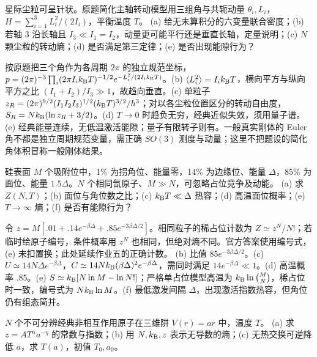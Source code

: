 \begin{exercise}
星际尘粒可呈针状。原题简化主轴转动模型用三组角与共轭动量 $\theta_i,L_i$，$H=\sum_{i=1}^3L_i^2/(2I_i)$，平衡温度 $T$。
(a) 给无未算积分的六变量联合密度；(b) 若轴 3 沿长轴且 $I_3\ll I_1=I_2$，动量更可能平行还是垂直长轴，定量说明；(c) $N$ 颗尘粒的转动熵；(d) 是否满足第三定律；(e) 是否出现能隙行为？
\end{exercise}
\begin{solution}
按原题把三个角作为各周期 $2\pi$ 的独立规范坐标，$p=(2\pi)^{-3}\prod_i(2\pi I_ik_{\mathrm B} T)^{-1/2}e^{-L_i^2/(2I_ik_{\mathrm B} T)}$。(b) $\langle L_i^2\rangle=I_ik_{\mathrm B} T$，横向平方与纵向平方之比 $(I_1+I_2)/I_3\gg1$，故趋向垂直。(c) 单粒子 $z_R=(2\pi)^{9/2}(I_1I_2I_3)^{1/2}(k_{\mathrm B} T)^{3/2}/h^3$；对以各尘粒位置区分的转动自由度，$S_R=Nk_{\mathrm B}(\ln z_R+3/2)$。(d) $T\to0$ 时趋负无穷，经典近似失效，须用量子谱。(e) 经典能量连续，无低温激活能隙；量子有限转子则有。一般真实刚体的 Euler 角不都是独立周期规范变量，需正确 $SO(3)$ 测度与动量；这里不把题设的简化角体积冒称一般刚体结果。
\end{solution}
\begin{exercise}
硅表面 $M$ 个吸附位中，1\% 为拐角位、能量零，14\% 为边缘位、能量 $\Delta$，85\% 为面位、能量 $1.5\Delta$。$N$ 个相同氙原子、$M\gg N$，可忽略占位竞争及动能。
(a) 求 $Z(N,T)$；(b) 面位与角位数之比；(c) $k_{\mathrm B} T\ll\Delta$ 热容；(d) 高温面位概率；(e) $T\to\infty$ 熵；(f) 是否有能隙行为？
\end{exercise}
\begin{solution}
令 $z=M[.01+.14e^{-\beta\Delta}+.85e^{-3\beta\Delta/2}]$。相同粒子的稀占位计数为 $Z\simeq z^N/N!$；若临时给原子编号，条件概率用 $z^N$ 也相同，但绝对熵不同。官方答案使用编号式，(e) 未扣置换；此处延续作业五的正确计数。
(b) 比值 $85e^{-3\beta\Delta/2}$。(c) $U\simeq14N\Delta e^{-\beta\Delta}$，$C\simeq14Nk_{\mathrm B}(\beta\Delta)^2e^{-\beta\Delta}$，需同时满足 $14e^{-\beta\Delta}\ll1$。(d) 高温概率 $.85$。(e) $S\simeq k_{\mathrm B}[N\ln M-\ln N!]$；严格单占位模型高温为 $k_{\mathrm B}\ln\binom MN$，稀占位时一致，编号式为 $Nk_{\mathrm B}\ln M$。(f) 最低激发间隔 $\Delta$，出现激活指数热容，但角位仍有组态简并。
\end{solution}
\begin{exercise}
$N$ 个不可分辨经典非相互作用原子在三维阱 $V(r)=ar$ 中，温度 $T$。
(a) 求 $z=AT^\alpha a^{-\eta}$ 的常数与指数；(b) 用 $N,k_{\mathrm B},z$ 表示无导数的熵；(c) 无热交换可逆降低 $a$，求 $T(a)$，初值 $T_0,a_0$。
\end{exercise}
